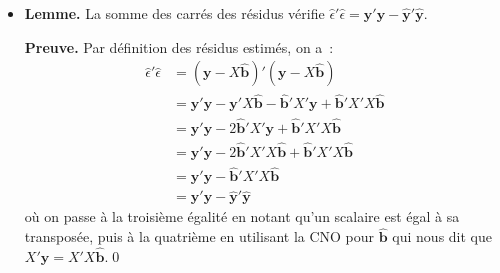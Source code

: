 \documentclass[10pt,a4paper]{article}
\theoremstyle{definition}
\renewcommand{\newline}{\unskip\par\vspace{1.5pt}}
\begin{document}
\begin{notes}
  \begin{itemize}

  \item \textbf{Lemme.} La somme des carrés des résidus vérifie $\hat\epsilon'\hat\epsilon = \mathbf y'\mathbf y - \hat{\mathbf y}'\hat{\mathbf y}$.\newline

    \textbf{Preuve.} Par définition des résidus estimés, on a~:
    \[
      \begin{split}
        \hat\epsilon'\hat\epsilon &= (\mathbf y-X\hat{\mathbf b})'(\mathbf y-X\hat{\mathbf b})\\
                                  &= \mathbf y'\mathbf y - \mathbf y'X\hat{\mathbf b} - \hat{\mathbf b}'X'\mathbf y + \hat{\mathbf b}'X'X\hat{\mathbf b}\\
                                  &= \mathbf y'\mathbf y - 2\hat{\mathbf b}'X'\mathbf y + \hat{\mathbf b}'X'X\hat{\mathbf b}\\
                                  &= \mathbf y'\mathbf y - 2\hat{\mathbf b}'X'X\hat{\mathbf b} + \hat{\mathbf b}'X'X\hat{\mathbf b}\\
                                  &= \mathbf y'\mathbf y - \hat{\mathbf b}'X'X\hat{\mathbf b}\\
                                  &= \mathbf y'\mathbf y - \hat{\mathbf y}'\hat{\mathbf y}
      \end{split}
    \]
où on passe à la troisième égalité en notant qu'un scalaire est égal à sa transposée, puis à la quatrième en utilisant la CNO pour $\hat{\mathbf b}$ qui nous dit que $X'\mathbf y = X'X \hat{\mathbf b}$.\qed\newline


\end{itemize}
\end{notes}
\end{document}
